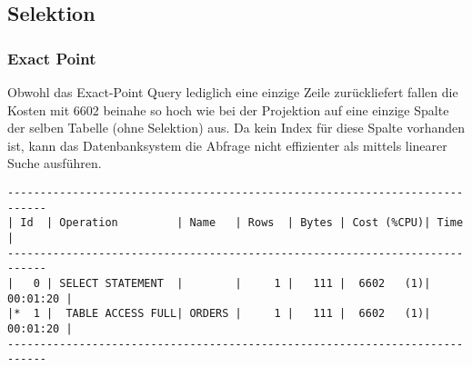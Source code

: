 \documentclass[11pt,a4paper,parskip=half]{scrartcl}
\begin{document}
\subsection{Selektion}
\subsubsection{Exact Point}
\label{no-idx-sel-exactpoint}
Obwohl das Exact-Point Query lediglich eine einzige Zeile zurückliefert fallen die Kosten mit 6602 beinahe so hoch wie bei der Projektion auf eine einzige Spalte der selben Tabelle (ohne Selektion) aus. Da kein Index für diese Spalte vorhanden ist, kann das Datenbanksystem die Abfrage nicht effizienter als mittels linearer Suche ausführen.
\begin{lstlisting}
----------------------------------------------------------------------------                                                                                                                                                                                                                                 
| Id  | Operation         | Name   | Rows  | Bytes | Cost (%CPU)| Time     |                                                                                                                                                                                                                                 
----------------------------------------------------------------------------                                                                                                                                                                                                                                 
|   0 | SELECT STATEMENT  |        |     1 |   111 |  6602   (1)| 00:01:20 |                                                                                                                                                                                                                                 
|*  1 |  TABLE ACCESS FULL| ORDERS |     1 |   111 |  6602   (1)| 00:01:20 |                                                                                                                                                                                                                                 
----------------------------------------------------------------------------                                                                                                                                                                                                                                 
                                                                                                                                                                                                                                                                                                             

\end{lstlisting}
\end{document}
